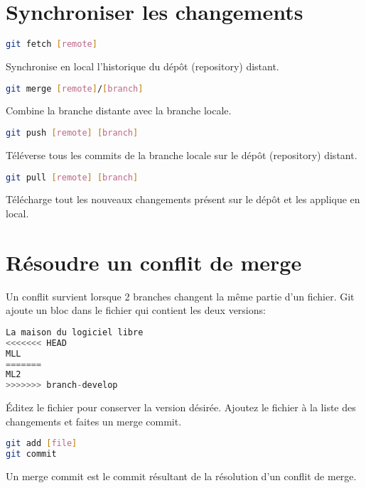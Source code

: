\documentclass[10pt,landscape]{article}
\begin{document}
\begin{multicols*}{3}
\section{Synchroniser les changements}
\begin{lstlisting}[language=bash]
git fetch [remote]
\end{lstlisting}
Synchronise en local l'historique du dépôt (repository) distant.
\begin{lstlisting}[language=bash]
git merge [remote]/[branch]
\end{lstlisting}
Combine la branche distante avec la branche locale.
\begin{lstlisting}[language=bash]
git push [remote] [branch]
\end{lstlisting}
Téléverse tous les commits de la branche locale sur le dépôt (repository) distant.
\begin{lstlisting}[language=bash]
git pull [remote] [branch]
\end{lstlisting}
Télécharge tout les nouveaux changements présent sur le dépôt et les applique en local.

\section{Résoudre un conflit de merge}
Un conflit survient lorsque 2 branches changent la même partie d'un fichier. Git
ajoute un bloc dans le fichier qui contient les deux versions:
\begin{lstlisting}[language=c]
La maison du logiciel libre
<<<<<<< HEAD
MLL
=======
ML2
>>>>>>> branch-develop
\end{lstlisting}
Éditez le fichier pour conserver la version désirée. Ajoutez le fichier à la
liste des changements et faites un merge commit.
\begin{lstlisting}[language=bash]
git add [file]
git commit
\end{lstlisting}
Un merge commit est le commit résultant de la résolution d'un conflit de merge.

\end{multicols*}
\end{document}
